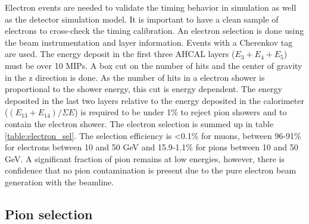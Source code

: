 \documentclass{JINST}
\begin{document}
Electron events are needed to validate the timing behavior in simulation as well as the detector simulation model. It is important to have a clean sample of electrons to cross-check the timing calibration. An electron selection is done using the beam instrumentation and layer information. Events with a Cherenkov tag are used. The energy deposit in the first three AHCAL layers ($E_3+E_4+E_5$) must be over 10 MIPs. A box cut on the number of hits and the center of gravity in the z direction is done. As the number of hits in a electron shower is proportional to the shower energy, this cut is energy dependent. The energy deposited in the last two layers relative to the energy deposited in the calorimeter ($(E_{13}+E_{14})/\Sigma E$) is required to be under 1\% to reject pion showers and to contain the electron shower. The electron selection is summed up in table \ref{table:electron_sel}. The selection efficiency is <0.1\% for muons, between 96-91\% for electrons between 10 and 50 GeV and 15.9-1.1\% for pions between 10 and 50 GeV. A significant fraction of pion remains at low energies, however, there is confidence that no pion contamination is present due to the pure electron beam generation with the beamline.

\subsection{Pion selection}
\label{sec:pionsel}
\end{document}
